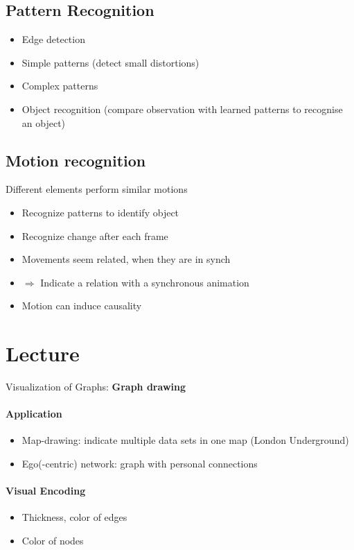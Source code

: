 \documentclass[ngerman]{scrartcl}
\begin{document}
\subsection{Pattern Recognition}
\begin{itemize}
  \item Edge detection
  \item Simple patterns (detect small distortions)
  \item Complex patterns
  \item Object recognition (compare observation with learned patterns to recognise an object)
\end{itemize}


\subsection{Motion recognition}
Different elements perform similar motions
\begin{itemize}
  \item Recognize patterns to identify object
  \item Recognize change after each frame
  \item Movements seem related, when they are in synch
  \item $ \Rightarrow $ Indicate a relation with a synchronous animation 
  \item Motion can induce causality
\end{itemize}


\section{Lecture}
Visualization of Graphs: \textbf{Graph drawing}
\paragraph{Application}
\begin{itemize}
  \item Map-drawing: indicate multiple data sets in one map (London Underground)
  \item Ego(-centric) network: graph with personal connections 
\end{itemize}

\paragraph{Visual Encoding}
\begin{itemize}
  \item Thickness, color of edges
  \item Color of nodes
\end{itemize}
\end{document}
